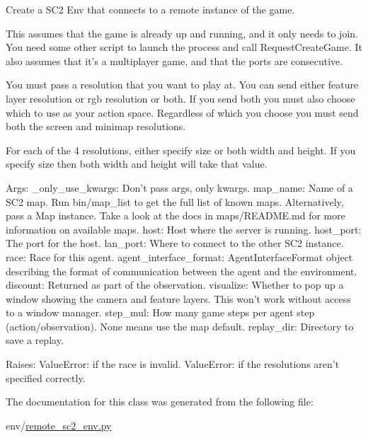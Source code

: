 \begin{DoxyVerb}Create a SC2 Env that connects to a remote instance of the game.

This assumes that the game is already up and running, and it only needs to
join. You need some other script to launch the process and call
RequestCreateGame. It also assumes that it's a multiplayer game, and that
the ports are consecutive.

You must pass a resolution that you want to play at. You can send either
feature layer resolution or rgb resolution or both. If you send both you
must also choose which to use as your action space. Regardless of which you
choose you must send both the screen and minimap resolutions.

For each of the 4 resolutions, either specify size or both width and
height. If you specify size then both width and height will take that value.

Args:
  _only_use_kwargs: Don't pass args, only kwargs.
  map_name: Name of a SC2 map. Run bin/map_list to get the full list of
  known maps. Alternatively, pass a Map instance. Take a look at the
  docs in maps/README.md for more information on available maps.
  host: Host where the server is running.
  host_port: The port for the host.
  lan_port: Where to connect to the other SC2 instance.
  race: Race for this agent.
  agent_interface_format: AgentInterfaceFormat object describing the
  format of communication between the agent and the environment.
  discount: Returned as part of the observation.
  visualize: Whether to pop up a window showing the camera and feature
  layers. This won't work without access to a window manager.
  step_mul: How many game steps per agent step (action/observation). None
  means use the map default.
  replay_dir: Directory to save a replay.

Raises:
  ValueError: if the race is invalid.
  ValueError: if the resolutions aren't specified correctly.
\end{DoxyVerb}
 

The documentation for this class was generated from the following file\+:\begin{DoxyCompactItemize}
\item 
env/\mbox{\hyperlink{remote__sc2__env_8py}{remote\+\_\+sc2\+\_\+env.\+py}}\end{DoxyCompactItemize}
